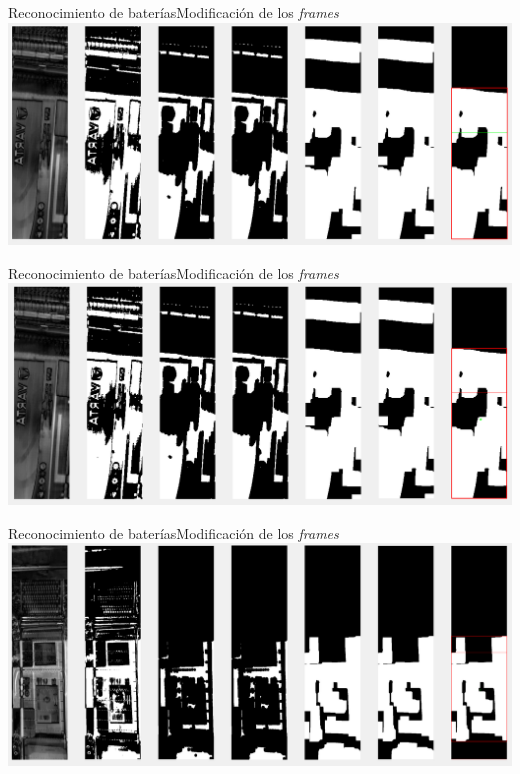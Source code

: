 \documentclass{beamer}
\begin{document}
\begin{frame}{Reconocimiento de baterías}{Modificación de los \textit{frames}}
\centering
\includegraphics[width=0.95\paperwidth, height=0.8\paperheight]{img/T1}%
\end{frame}

\begin{frame}{Reconocimiento de baterías}{Modificación de los \textit{frames}}
\centering
\includegraphics[width=0.95\paperwidth, height=0.8\paperheight]{img/T2}%
\end{frame}

\begin{frame}{Reconocimiento de baterías}{Modificación de los \textit{frames}}
\centering
\includegraphics[width=0.95\paperwidth, height=0.8\paperheight]{img/T3}%
\end{frame}
\end{document}
